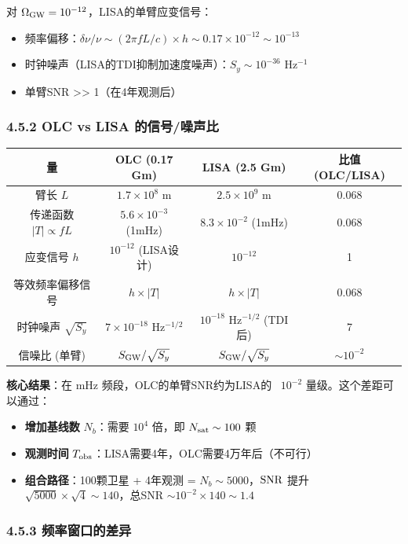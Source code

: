 \documentclass[12pt,a4paper]{article}
\begin{document}
对 $\Omega_{\rm GW} = 10^{-12}$，LISA的单臂应变信号：
\begin{itemize}
  \item 频率偏移：$\delta\nu/\nu \sim (2\pi f L/c) \times h \sim 0.17 \times 10^{-12} \sim 10^{-13}$
  \item 时钟噪声（LISA的TDI抑制加速度噪声）：$S_y \sim 10^{-36}$ Hz$^{-1}$
  \item 单臂SNR >> 1（在4年观测后）

\end{itemize}
\subsubsection{4.5.2 OLC vs LISA 的信号/噪声比}


\begin{tabular}{|c|c|c|c|}
\hline
量 & OLC (0.17 Gm) & LISA (2.5 Gm) & 比值 (OLC/LISA) \\
\hline
臂长 $L$ & $1.7 \times 10^8$ m & $2.5 \times 10^9$ m & 0.068 \\
传递函数 $|T| \propto fL$ & $5.6 \times 10^{-3}$ (1mHz) & $8.3 \times 10^{-2}$ (1mHz) & 0.068 \\
应变信号 $h$ & $10^{-12}$ (LISA设计) & $10^{-12}$ & 1 \\
等效频率偏移信号 & $h \times |T|$ & $h \times |T|$ & 0.068 \\
时钟噪声 $\sqrt{S_y}$ & $7 \times 10^{-18}$ Hz$^{-1/2}$ & $10^{-18}$ Hz$^{-1/2}$ (TDI后) & 7 \\
信噪比 (单臂) & $S_{\rm GW}/\sqrt{S_y}$ & $S_{\rm GW}/\sqrt{S_y}$ & $\sim 10^{-2}$ \\
\hline
\end{tabular}


\textbf{核心结果}：在 mHz 频段，OLC的单臂SNR约为LISA的 ~$10^{-2}$ 量级。这个差距可以通过：
\begin{itemize}
  \item[1] \textbf{增加基线数} $N_b$：需要 $10^4$ 倍，即 $N_{\rm sat} \sim 100$ 颗
  \item[2] \textbf{观测时间} $T_{\rm obs}$：LISA需要4年，OLC需要4万年后（不可行）
  \item[3] \textbf{组合路径}：100颗卫星 + 4年观测 = $N_b \sim 5000$，${\rm SNR}$ 提升 $\sqrt{5000} \times \sqrt{4} \sim 140$，总SNR $\sim 10^{-2} \times 140 \sim 1.4$

\end{itemize}
\subsubsection{4.5.3 频率窗口的差异}
\end{document}
